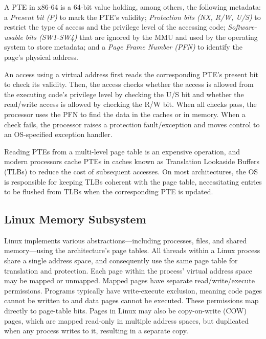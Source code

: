 A PTE in x86-64 is a 64-bit value holding, among others, the following metadata:
a \emph{Present bit (P)} to mark the PTE's validity;
\emph{Protection bits (NX, R/W, U/S)} to restrict the type of
access and the privilege level of the accessing code;
\emph{Software-usable bits (SW1-SW4)} that are ignored by the MMU and used by the
operating system to store metadata; and
a \emph{Page Frame Number (PFN)} to identify the page's physical address.

An access using a virtual address first reads the corresponding PTE's
present bit to check its validity.
Then, the access checks whether the access is allowed from the executing
code's privilege level by checking the U/S bit and whether the
read/write access is allowed by checking the R/W bit.
When all checks pass, the processor uses the PFN to find the data in
the caches or in memory.
When a check fails, the processor raises a protection fault/exception and
moves control to an OS-specified exception handler.

Reading PTEs from a multi-level page table is an expensive operation, and
modern processors cache PTEs in caches known as Translation Lookaside
Buffers (TLBs) to reduce the cost of subsequent accesses.
On most architectures, the OS is responsible for keeping TLBs coherent with
the page table, necessitating entries to be flushed from TLBs when the
corresponding PTE is updated.


\subsection{Linux Memory Subsystem}

Linux implements various abstractions---including processes, files, and shared
memory---using the architecture's page tables.
All threads within a Linux process share a single address space, and
consequently use the same page table for translation and protection.
Each page within the process' virtual address space may be mapped or
unmapped. Mapped pages have separate read/write/execute permissions.
Programs typically have write-execute exclusion, meaning
code pages cannot be written to and data pages cannot be executed.
These permissions map directly to page-table bits.
Pages in Linux may also be copy-on-write (COW) pages, which are mapped read-only
in multiple address spaces, but duplicated when any process writes
to it, resulting in a separate copy.

